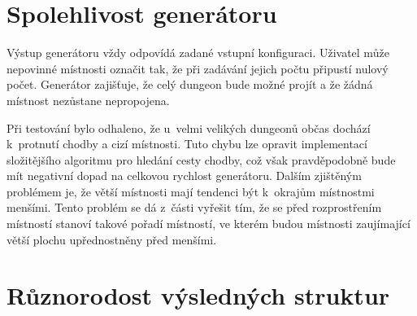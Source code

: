 
\section{Spolehlivost generátoru}


Výstup generátoru vždy odpovídá zadané vstupní konfiguraci.
Uživatel může nepovinné místnosti označit tak, že při zadávání jejich počtu připustí nulový počet.
Generátor zajišťuje, že celý dungeon bude možné projít a že žádná místnost nezůstane nepropojena.
\par
Při testování bylo odhaleno, že u~velmi velikých dungeonů občas dochází k~protnutí chodby a cizí místnosti.
Tuto chybu lze opravit implementací složitějšího algoritmu pro hledání cesty chodby, což však pravděpodobně bude mít negativní dopad na celkovou rychlost generátoru.
Dalším zjištěným problémem je, že větší místnosti mají tendenci být  k~okrajům místnostmi menšími.
Tento problém se dá z~části vyřešit tím, že se před rozprostřením místností stanoví takové pořadí místností, ve kterém budou místnosti zaujímající větší plochu upřednostněny před menšími.


\section{Různorodost výsledných struktur}


